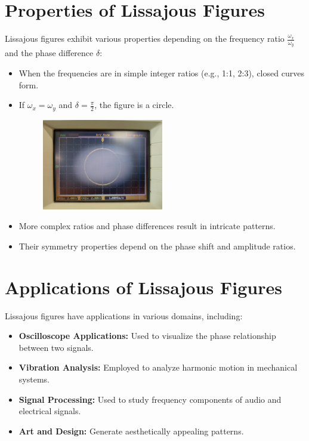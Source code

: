 \documentclass{article}
\begin{document}
\section{Properties of Lissajous Figures}
Lissajous figures exhibit various properties depending on the frequency ratio $\frac{\omega_x}{\omega_y}$ and the phase difference $\delta$:
\begin{itemize}
\item When the frequencies are in simple integer ratios (e.g., 1:1, 2:3), closed curves form.
\item If $\omega_x = \omega_y$ and $\delta = \frac{\pi}{2}$, the figure is a circle.

\begin{figure}[h!]
\centering
\includegraphics[width=0.5\textwidth]{codes/figs/fig.png}
\label{fig:lissajous}
\end{figure}

\item More complex ratios and phase differences result in intricate patterns.
\item Their symmetry properties depend on the phase shift and amplitude ratios.
\end{itemize}

\section{Applications of Lissajous Figures}
Lissajous figures have applications in various domains, including:
\begin{itemize}
\item \textbf{Oscilloscope Applications:} Used to visualize the phase relationship between two signals.
\item \textbf{Vibration Analysis:} Employed to analyze harmonic motion in mechanical systems.
\item \textbf{Signal Processing:} Used to study frequency components of audio and electrical signals.
\item \textbf{Art and Design:} Generate aesthetically appealing patterns.
\end{itemize}
\end{document}
